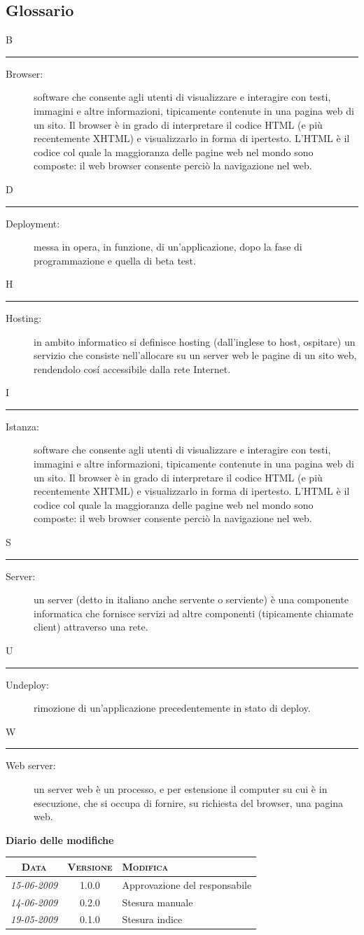 \documentclass[11pt,a4paper]{article}
\newcommand{\modifiche} 
{
\newpage
\begin{center}
\textbf{Diario delle modifiche} \\
\bigskip
\begin{tabular}{|c|c|p{0.62\textwidth}|}
\hline
\textsc{Data} & \textsc{Versione} & \textsc{Modifica} \\
\hline
\hline
\textit{15-06-2009} & 1.0.0 & Approvazione del responsabile\\
\hline
\textit{14-06-2009} & 0.2.0 & Stesura manuale\\
\hline
\textit{19-05-2009} & 0.1.0 & Stesura indice\\
\hline
\end{tabular}
\end{center}
}
\begin{document}
\subsection{Glossario}
\flushleft 
\Huge B \bigskip
\hrule
\smallskip
\normalsize
\begin{description}
	\item[Browser:] software che consente agli utenti di visualizzare e interagire con testi, immagini e altre informazioni, tipicamente contenute in una pagina web di un sito. Il browser è in grado di interpretare il codice HTML (e più recentemente XHTML) e visualizzarlo in forma di ipertesto. L'HTML è il codice col quale la maggioranza delle pagine web nel mondo sono composte: il web browser consente perciò la navigazione nel web.
\end{description}
\bigskip
\Huge D \bigskip
\hrule
\smallskip
\normalsize
\begin{description}
	\item[Deployment:] messa in opera, in funzione, di un'applicazione, dopo la fase di programmazione e quella di beta test.
\end{description}
\bigskip
\Huge H \bigskip
\hrule
\smallskip
\normalsize
\begin{description}
	\item[Hosting:] in ambito informatico si definisce hosting (dall'inglese to host, ospitare) un servizio che consiste nell'allocare su un server web le pagine di un sito web, rendendolo cosí accessibile dalla rete Internet.

\end{description}
\bigskip
\Huge I \bigskip
\hrule
\smallskip
\normalsize
\begin{description}
	\item[Istanza:] software che consente agli utenti di visualizzare e interagire con testi, immagini e altre informazioni, tipicamente contenute in una pagina web di un sito. Il browser è in grado di interpretare il codice HTML (e più recentemente XHTML) e visualizzarlo in forma di ipertesto. L'HTML è il codice col quale la maggioranza delle pagine web nel mondo sono composte: il web browser consente perciò la navigazione nel web.
\end{description}
\bigskip
\Huge S \bigskip
\hrule
\smallskip
\normalsize
\begin{description}
	\item[Server:] un server (detto in italiano anche servente o serviente) è una componente informatica che fornisce servizi ad altre componenti (tipicamente chiamate client) attraverso una rete.
\end{description}
\bigskip
\Huge U \bigskip
\hrule
\smallskip
\normalsize
\begin{description}
	\item[Undeploy:] rimozione di un'applicazione precedentemente in stato di deploy.
\end{description}
\bigskip
\Huge W \bigskip
\hrule
\smallskip
\normalsize
\begin{description}
	\item[Web server:] un server web è un processo, e per estensione il computer su cui è in esecuzione, che si occupa di fornire, su richiesta del browser, una pagina web.
\end{description}
\modifiche
\end{document}
